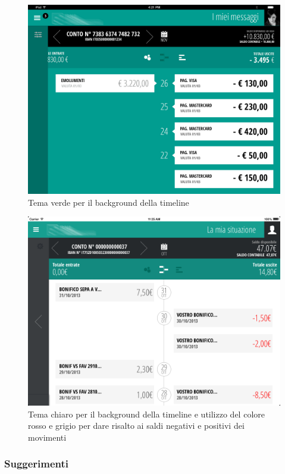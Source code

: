 \begin{figure}[!htbp]
\centering
\includegraphics[scale=0.30]{ux/timeline3.png}
\caption{Tema verde per il background della timeline}
\end{figure}
\begin{figure}[!htbp]
\centering
\includegraphics[scale=0.30]{ux/timelinebianca.png}
\caption{Tema chiaro per il background della timeline e utilizzo del colore rosso e grigio per dare risalto ai saldi negativi e positivi dei movimenti}
\end{figure}

\newpage
\subsubsection{Suggerimenti}

